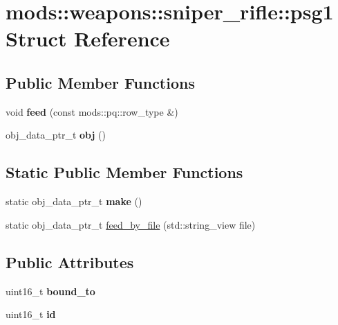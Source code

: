 \hypertarget{structmods_1_1weapons_1_1sniper__rifle_1_1psg1}{}\section{mods\+:\+:weapons\+:\+:sniper\+\_\+rifle\+:\+:psg1 Struct Reference}
\label{structmods_1_1weapons_1_1sniper__rifle_1_1psg1}
\subsection*{Public Member Functions}
\begin{DoxyCompactItemize}
\item 
\mbox{\label{structmods_1_1weapons_1_1sniper__rifle_1_1psg1_ae3d20e532d279e24180da0e065fae58d}} 
void {\bfseries feed} (const mods\+::pq\+::row\+\_\+type \&)
\item 
\mbox{\label{structmods_1_1weapons_1_1sniper__rifle_1_1psg1_ae08e1cbf1c1744c812bf30f535bd1321}} 
obj\+\_\+data\+\_\+ptr\+\_\+t {\bfseries obj} ()
\end{DoxyCompactItemize}
\subsection*{Static Public Member Functions}
\begin{DoxyCompactItemize}
\item 
\mbox{\label{structmods_1_1weapons_1_1sniper__rifle_1_1psg1_a24cfcefbc8ad27d0132ad22ed2097dee}} 
static obj\+\_\+data\+\_\+ptr\+\_\+t {\bfseries make} ()
\item 
static obj\+\_\+data\+\_\+ptr\+\_\+t \hyperlink{structmods_1_1weapons_1_1sniper__rifle_1_1psg1_aea7a737419eddf516a916354f462d191}{feed\+\_\+by\+\_\+file} (std\+::string\+\_\+view file)
\end{DoxyCompactItemize}
\subsection*{Public Attributes}
\begin{DoxyCompactItemize}
\item 
\mbox{\label{structmods_1_1weapons_1_1sniper__rifle_1_1psg1_a3f4eab844fe0841932f084a4c10ecaea}} 
uint16\+\_\+t {\bfseries bound\+\_\+to}
\item 
\mbox{\label{structmods_1_1weapons_1_1sniper__rifle_1_1psg1_adbbe5cac18458ecd2b5bc861a194da7d}} 
uint16\+\_\+t {\bfseries id}
\end{DoxyCompactItemize}
